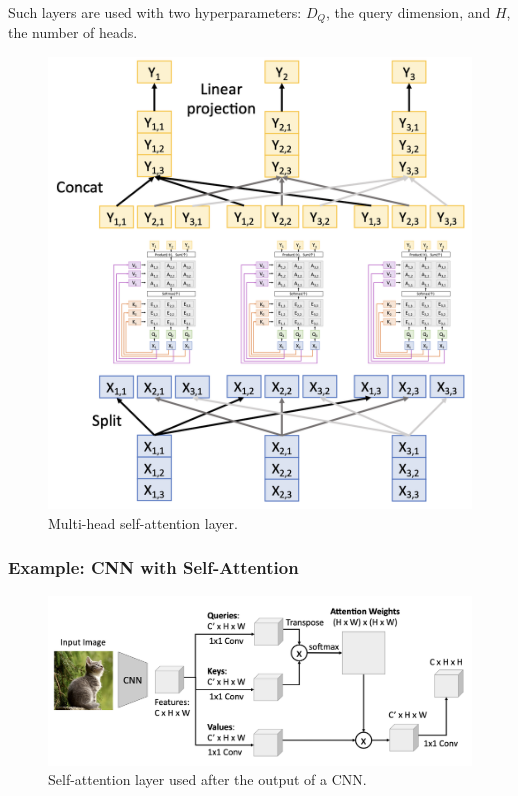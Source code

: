 Such layers are used with two hyperparameters: $D_Q$, the query dimension, and $H$, the number of heads.
\begin{figure}[H]
    \centering
    \includegraphics[width=.45\textwidth]{images/multi-head-attention.png}
    \caption{Multi-head self-attention layer.}
\end{figure}

\subsubsection{Example: CNN with Self-Attention}
\begin{figure}[H]
    \centering
    \includegraphics[width=.85\textwidth]{images/self-attention-cnn.png}
    \caption{Self-attention layer used after the output of a CNN.}
\end{figure}

\newpage